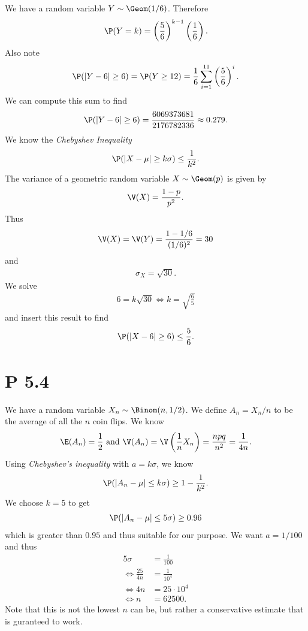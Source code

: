 \documentclass{article}
\begin{document}
We have a random variable $Y\sim\Geom(1/6)$. Therefore
\begin{align*}
	\P(Y=k) = \left(\frac{5}{6}\right)^{k-1}\left(\frac{1}{6}\right).
\end{align*}
Also note
\begin{align*}
	\P(|Y-6|\geq 6) = \P(Y \geq 12) = \frac{1}{6}\sum_{i=1}^{11} \left(\frac{5}{6}\right)^i.
\end{align*}
We can compute this sum to find
\begin{align*}
	\P(|Y-6|\geq 6) = \frac{6069373681}{2176782336} \approx 0.279.
\end{align*}
We know the \emph{Chebyshev Inequality}
\begin{align*}
	\P(|X-\mu|\geq k\sigma) \leq \frac{1}{k^2}.
\end{align*}
The variance of a geometric random variable $X\sim\Geom(p)$ is given by
\begin{align*}
	\V(X) = \frac{1-p}{p^2}.
\end{align*}
Thus
\begin{align*}
	\V(X) = \V(Y) = \frac{1-1/6}{(1/6)^2} = 30
\end{align*}
and
\begin{align*}
	\sigma_X = \sqrt{30}.
\end{align*}
We solve
\begin{align*}
	6 = k\sqrt{30} \Leftrightarrow k = \sqrt{\frac{6}{5}}
\end{align*}
and insert this result to find
\begin{align*}
	\P(|X-6| \geq 6) \leq \frac{5}{6}.
\end{align*}


\section*{P 5.4}


We have a random variable $X_n\sim\Binom(n,1/2)$. We define
$A_n = X_n / n$ to be the average of all the $n$ coin flips.
We know
\begin{align*}
	\E(A_n) = \frac{1}{2} \text{ and }
	\V(A_n) = \V\left(\frac{1}{n}X_n\right) = \frac{npq}{n^2} = \frac{1}{4n}.
\end{align*}
Using \emph{Chebyshev's inequality} with $a=k\sigma$, we know
\begin{align*}
	\P(|A_n - \mu| \leq k\sigma) \geq 1 - \frac{1}{k^2}.
\end{align*}
We choose $k=5$ to get
\begin{align*}
	\P(|A_n - \mu| \leq 5\sigma) \geq 0.96
\end{align*}
which is greater than $0.95$ and thus suitable for our purpose.
We want $a=1/100$ and thus
\begin{align*}
	5\sigma                       & = \frac{1}{100}  \\
	\Leftrightarrow \frac{25}{4n} & = \frac{1}{10^4} \\
	\Leftrightarrow 4n            & = 25\cdot 10^4   \\
	\Leftrightarrow n             & = 62500.
\end{align*}
Note that this is not the lowest $n$ can be, but rather a conservative
estimate that is guranteed to work.
\end{document}
